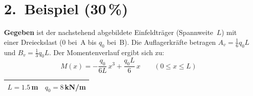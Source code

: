 \documentclass[a4paper,11pt]{article}
\begin{document}
\newpage
\section*{2.~Beispiel \hfill (30\,\%)}

\textbf{Gegeben} ist der nachstehend abgebildete Einfeldträger (Spannweite~$L$)
mit einer Dreieckslast (0 bei~A bis $q_0$ bei~B).
Die Auflagerkräfte betragen $A_v = \tfrac{1}{6}q_0 L$ und $B_v = \tfrac{1}{3}q_0 L$.
Der Momentenverlauf ergibt sich zu:
\[
  M(x) = -\frac{q_0}{6L}\,x^3 + \frac{q_0 L}{6}\,x
  \qquad (0 \le x \le L)
\]

\begin{tabular}{|c|c|}
\hline
$L = 1.5$\,m & $q_0 = 8$\,kN/m \\
\hline
\end{tabular}
\end{document}
